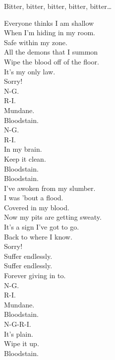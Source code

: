 Bitter, bitter, bitter, bitter, bitter… \\




Everyone thinks I am shallow \\
When I'm hiding in my room. \\
Safe within my zone. \\

All the demons that I summon \\
Wipe the blood off of the floor. \\
It's my only law. \\

Sorry! \\

N-G. \\
R-I. \\
Mundane. \\
Bloodstain. \\
N-G. \\
R-I. \\
In my brain. \\
Keep it clean. \\
Bloodstain. \\

Bloodstain. \\

I've awoken from my slumber. \\
I was  'bout a flood. \\
Covered in my blood. \\

Now my pits are getting sweaty. \\
It's a sign I've got to go. \\
Back to where I know. \\

Sorry! \\

Suffer endlessly. \\
Suffer endlessly. \\
Forever giving in to. \\

N-G. \\
R-I. \\
Mundane. \\
Bloodstain. \\
N-G-R-I. \\
It's plain. \\
Wipe it up. \\
Bloodstain. \\

